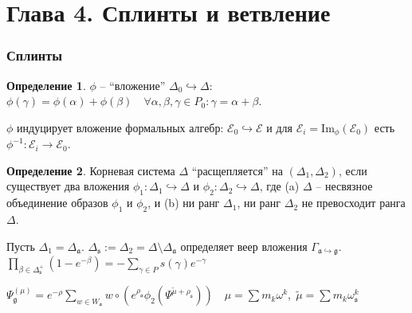 \documentclass[pdftex]{beamer}
\newcommand{\gf}{\mathfrak{g}}
\newcommand{\af}{\mathfrak{a}}
\newcommand{\sfr}{\mathfrak{s}}
\theoremstyle{definition} \newtheorem{Def}{Определение}
\begin{document}
\section{Глава 4. Сплинты и ветвление}
\begin{frame}
  \frametitle{Сплинты}
  \begin{Def}
$\phi $ -- ``вложение'' $\Delta_{0}\hookrightarrow \Delta$:
$\phi (\gamma )=\phi (\alpha )+\phi (\beta )\quad  \forall \alpha ,\beta ,\gamma \in P_{0}: \gamma =\alpha+\beta.$

\end{Def}
$\phi$ индуцирует вложение формальных алгебр: ${\mathcal{E}}_0\hookrightarrow \mathcal{E}$ и  для ${\mathcal{E}}_i=\mathrm{Im}_{\phi}\left( {\mathcal{E}}_0\right)$ есть $\phi^{-1}:{\mathcal{E}}_i \longrightarrow {\mathcal{E}}_0$.

\begin{Def}
Корневая система $\Delta$ ``расщепляется'' на  $(\Delta _{1},\Delta _{2})$, если существует два вложения  $\phi _{1}:\Delta _{1}\hookrightarrow \Delta $ и $\phi _{2}:\Delta _{2}\hookrightarrow \Delta $, где (a) $\Delta $ -- несвязное объединение образов $\phi _{1}$ и $\phi _{2}$, и (b) ни ранг  $\Delta _{1}$, ни ранг  $\Delta _{2}$ не превосходит ранга $\Delta $.
\end{Def}
Пусть $\Delta _{1}=\Delta _{\af}$. $\Delta _{\sfr}:=\Delta_{2}=\Delta \setminus \Delta _{\af}$ определяет  веер вложения  $\Gamma _{\af\hookrightarrow \gf}$. 
$\prod_{\beta \in \Delta _{\sfr}^{+}}\left( 1-e^{-\beta }\right)
=-\sum_{\gamma \in P}s(\gamma )e^{-\gamma }$

$\Psi _{\gf}^{\left( \mu \right) }=e^{-\rho}\sum_{w\in W_{\af}}w\circ \left(
e^{\rho _{\af}}\phi_{2}\left(\Psi ^{\widetilde{\mu }+\rho _{\sfr}}\right)\right) \quad \mu=\sum m_{k}\omega ^{k},\;\widetilde{\mu }=\sum m_{k}\omega _{\sfr}^{k}$

\end{frame}
\end{document}
